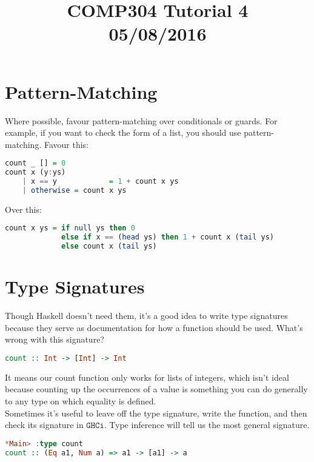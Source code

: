 \documentclass[a4paper,12pt]{article}
\newcommand{\kwa}[1]{\mathtt{#1}}
\begin{document}
\title{COMP304 Tutorial 4 \\ 05/08/2016}
\date{}
\maketitle

\section{Pattern-Matching}

\noindent
Where possible, favour pattern-matching over conditionals or guards. For example, if you want to check the form of a list, you should use pattern-matching. Favour this:

\begin{lstlisting}[language=Haskell]
count _ [] = 0
count x (y:ys)
	| x == y			= 1 + count x ys
	| otherwise	= count x ys
\end{lstlisting}

\noindent
Over this:

\begin{lstlisting}[language=Haskell]
count x ys = if null ys then 0
             else if x == (head ys) then 1 + count x (tail ys)
             else count x (tail ys)
\end{lstlisting}

\section{Type Signatures}

\noindent
Though Haskell doesn't need them, it's a good idea to write type signatures because they serve as documentation for how a function should be used. What's wrong with this signature?

\begin{lstlisting}[language=Haskell]
count :: Int -> [Int] -> Int
\end{lstlisting}

\noindent
It means our count function only works for lists of integers, which isn't ideal because counting up the occurrences of a value is something you can do generally to any type on which equality is defined. \\

\noindent
Sometimes it's useful to leave off the type signature, write the function, and then check its signature in $\kwa{GHCi}$. Type inference will tell us the most general signature.

\begin{lstlisting}[language=Haskell]
*Main> :type count
count :: (Eq a1, Num a) => a1 -> [a1] -> a
\end{lstlisting}
\end{document}
